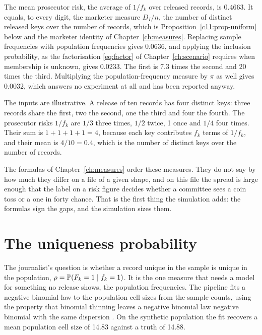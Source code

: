 The mean prosecutor risk, the average of $1/f_k$ over released records, is 0.4663.
It equals, to every digit, the marketer measure $D_I/n$, the number of distinct
released keys over the number of records, which is Proposition~\ref{c11:prop-uniform}
below and the marketer identity of Chapter~\ref{ch:measures}. Replacing
sample frequencies with population frequencies gives 0.0636, and applying the
inclusion probability, as the factorisation \eqref{eq:factor} of
Chapter~\ref{ch:scenario} requires when membership is unknown, gives 0.0233. The
first is 7.3 times the second and 20 times the third.
Multiplying the population-frequency measure by $\pi$ as well gives 0.0032, which
answers no experiment at all and has been reported anyway.

\begin{example}\label{c11:ex-marketer}
The inputs are illustrative. A release of ten records has four distinct keys: three
records share the first, two the second, one the third and four the fourth. The
prosecutor risks $1/f_k$ are $1/3$ three times, $1/2$ twice, 1 once and $1/4$ four times.
Their sum is $1 + 1 + 1 + 1 = 4$, because each key contributes $f_k$ terms of $1/f_k$,
and their mean is $4/10 = 0.4$, which is the number of distinct keys over the number of
records.
\end{example}


The formulas of Chapter~\ref{ch:measures} order these measures. They do not say
by how much they differ on a file of a given shape, and on this file the spread is
large enough that the label on a risk figure decides whether a committee sees a
coin toss or a one in forty chance. That is the first thing the simulation adds:
the formulas sign the gaps, and the simulation sizes them.

\section{The uniqueness probability}

The journalist's question is whether a record unique in the sample is unique in the
population, $\rho = \mathbb{P}(F_k = 1 \mid f_k = 1)$. It is the one measure that needs a
model for something no release shows, the population frequencies. The pipeline
fits a negative binomial law to the population cell sizes from the sample counts,
using the property that binomial thinning leaves a negative binomial law negative
binomial with the same dispersion \citep{bethlehem1990,rinott2006}. On the synthetic population
the fit recovers a mean population cell size of 14.83 against a truth of 14.88.

